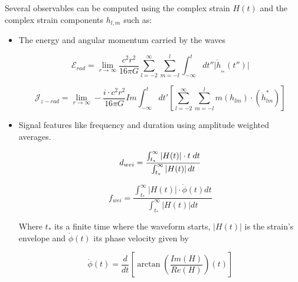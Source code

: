 Several observables can be computed using the complex strain $H(t)$ and the complex strain components $h_{l,m}$ such as:

\begin{itemize}

\item The energy and angular momentum carried by the waves \cite{Ruiz_2007}

%
%

\begin{equation}
\mathcal{E}_{rad} = \lim_{r\to\infty} \frac{c^2 r^2}{16\pi G} \sum_{l=-2}^{\infty}  \sum_{m=-l}^{l} \int_{-\infty}^{t} dt'' \Biggr|  \dot{h}_{_{_{lm}}}(t'')  \Biggr|
\end{equation}


\begin{equation}
\mathcal{J}_{z-rad} = \lim_{r\to\infty} -\frac{i \cdot c^2 r^2}{16\pi G} Im \int_{-\infty}^{t}dt'\left[ \sum_{l=-2}^{\infty} \sum_{m=-l}^{l} m  \left(h_{lm}\right)  \cdot \left( \dot{h}^*_{lm} \right) \right]
\end{equation}

\item Signal features like frequency and duration using amplitude weighted averages.

\begin{equation}\label{dwei}
d_{wei} = \frac{\int_{t_{*}}^{\infty} \left| H(t) \right| \cdot t \hspace{1mm}dt }{\int_{t_{*}}^{\infty} \left| H(t) \right| dt}
\end{equation}

\begin{equation}\label{fwei}
f_{wei} = \frac{\int_{t_{*}}^{\infty}  \left| H(t) \right| \cdot \dot{\phi}(t)  dt }{\int_{t_{*}}^{\infty} \left| H(t) \right|dt}
\end{equation}

Where $t_{*}$ its a finite time where the waveform starts, $\left| H(t) \right|$ is the strain's envelope and $\dot{\phi}(t)$ its phase velocity given by 

\begin{equation}\label{curnc}
\dot{\phi}(t)=\frac{d}{dt} \left[ \arctan \left( \frac{Im(H)}{Re(H)} \right)(t) \right]
\end{equation}

\end{itemize}



